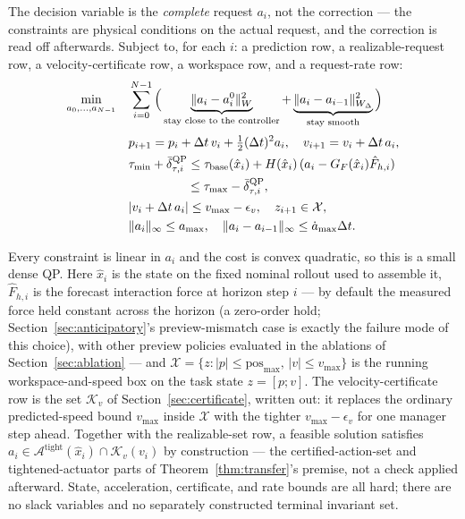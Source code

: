 \documentclass[journal]{IEEEtran}
\begin{document}
The decision variable is the \emph{complete} request $a_i$, not the correction --- the constraints are physical conditions on the actual request, and the correction is read off afterwards. Subject to, for each $i$: a prediction row, a realizable-request row, a velocity-certificate row, a workspace row, and a request-rate row:
\small
\begin{align}
\min_{a_0,\dots,a_{N-1}}\quad
&\sum_{i=0}^{N-1}
\Big(
\underbrace{\|a_i-a^0_i\|^2_{W}}_{\text{stay close to the controller}}
+\underbrace{\|a_i-a_{i-1}\|^2_{W_\Delta}}_{\text{stay smooth}}
\Big)\nonumber\\[2pt]
& p_{i+1}=p_i+\Delta t\,v_i+\tfrac12(\Delta t)^2a_i,
\quad v_{i+1}=v_i+\Delta t\,a_i, \nonumber\\
& \tau_{\min}+\bar\delta_{\tau,i}^{\mathrm{QP}}\le\tau_{\mathrm{base}}(\hat x_i)+H(\hat x_i)\,(a_i-G_F(\hat x_i)\hat F_{h,i}) \nonumber\\
&\hspace{4.7em}\le\tau_{\max}-\bar\delta_{\tau,i}^{\mathrm{QP}}, \nonumber\\
& |v_i+\Delta t\,a_i|\le v_{\max}-\epsilon_v,
\quad z_{i+1}\in\mathcal X, \nonumber\\
& \|a_i\|_\infty\le a_{\max},
\quad
\|a_i-a_{i-1}\|_\infty\le\dot a_{\max}\Delta t.
\label{eq:qp}
\end{align}
\normalsize

Every constraint is linear in $a_i$ and the cost is convex quadratic, so this is a small dense QP. Here $\hat x_i$ is the state on the fixed nominal rollout used to assemble it, $\hat F_{h,i}$ is the forecast interaction force at horizon step $i$ --- by default the measured force held constant across the horizon (a zero-order hold; Section~\ref{sec:anticipatory}'s preview-mismatch case is exactly the failure mode of this choice), with other preview policies evaluated in the ablations of Section~\ref{sec:ablation} --- and $\mathcal X=\{z:|p|\le\mathrm{pos}_{\max},\,|v|\le v_{\max}\}$ is the running workspace-and-speed box on the task state $z=[p;v]$. The velocity-certificate row is the set $\mathcal K_v$ of Section~\ref{sec:certificate}, written out: it replaces the ordinary predicted-speed bound $v_{\max}$ inside $\mathcal X$ with the tighter $v_{\max}-\epsilon_v$ for one manager step ahead. Together with the realizable-set row, a feasible solution satisfies $a_i\in\mathcal A^{\mathrm{tight}}(\hat x_i)\cap\mathcal K_v(v_i)$ by construction --- the certified-action-set and tightened-actuator parts of Theorem~\ref{thm:transfer}'s premise, not a check applied afterward. State, acceleration, certificate, and rate bounds are all hard; there are no slack variables and no separately constructed terminal invariant set.
\end{document}
